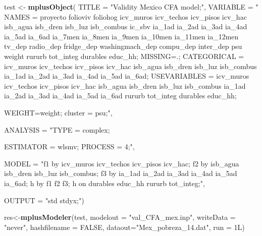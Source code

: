 \documentclass[]{book}
\newenvironment{Shaded}{\begin{snugshade}}{\end{snugshade}}
\newcommand{\DataTypeTok}[1]{\textcolor[rgb]{0.13,0.29,0.53}{#1}}
\newcommand{\KeywordTok}[1]{\textcolor[rgb]{0.13,0.29,0.53}{\textbf{#1}}}
\newcommand{\NormalTok}[1]{#1}
\newcommand{\OtherTok}[1]{\textcolor[rgb]{0.56,0.35,0.01}{#1}}
\newcommand{\StringTok}[1]{\textcolor[rgb]{0.31,0.60,0.02}{#1}}
\begin{document}
\begin{Shaded}
\begin{Highlighting}[]
\NormalTok{test <-}\StringTok{ }\KeywordTok{mplusObject}\NormalTok{(}
\DataTypeTok{TITLE =} \StringTok{"Validity Mexico CFA model;"}\NormalTok{,}
   \DataTypeTok{VARIABLE =} \StringTok{"}
\StringTok{     NAMES = proyecto folioviv foliohog icv_muros icv_techos}
\StringTok{             icv_pisos icv_hac isb_agua isb_dren isb_luz isb_combus}
\StringTok{             ic_sbv ia_1ad ia_2ad ia_3ad ia_4ad ia_5ad ia_6ad}
\StringTok{             ia_7men ia_8men ia_9men ia_10men ia_11men ia_12men}
\StringTok{             tv_dep radio_dep fridge_dep}
\StringTok{             washingmach_dep compu_dep inter_dep psu weight}
\StringTok{             rururb tot_integ durables educ_hh;}
\StringTok{MISSING=.;}
\StringTok{     CATEGORICAL = icv_muros icv_techos icv_pisos icv_hac isb_agua}
\StringTok{                   isb_dren isb_luz isb_combus  ia_1ad}
\StringTok{                   ia_2ad ia_3ad ia_4ad ia_5ad ia_6ad;}
\StringTok{     USEVARIABLES = icv_muros icv_techos icv_pisos icv_hac isb_agua}
\StringTok{                   isb_dren isb_luz isb_combus  ia_1ad}
\StringTok{                   ia_2ad ia_3ad ia_4ad ia_5ad ia_6ad}
\StringTok{                   rururb tot_integ durables educ_hh;}

\StringTok{WEIGHT=weight;}
\StringTok{cluster = psu;"}\NormalTok{,}

   \DataTypeTok{ANALYSIS =} \StringTok{"TYPE = complex;}

\StringTok{ESTIMATOR = wlsmv;}
\StringTok{PROCESS = 4;"}\NormalTok{,}

\DataTypeTok{MODEL =} \StringTok{"f1 by icv_muros icv_techos icv_pisos icv_hac;}
\StringTok{  f2 by isb_agua}
\StringTok{        isb_dren isb_luz isb_combus;}
\StringTok{  f3 by ia_1ad ia_2ad ia_3ad ia_4ad ia_5ad ia_6ad;}
\StringTok{  h  by f1 f2 f3;}
\StringTok{  h on durables educ_hh rururb tot_integ;"}\NormalTok{,}

\DataTypeTok{OUTPUT =} \StringTok{"std stdyx;"}\NormalTok{)}

\NormalTok{res<-}\KeywordTok{mplusModeler}\NormalTok{(test, }\DataTypeTok{modelout =} \StringTok{"val_CFA_mex.inp"}\NormalTok{,}
                    \DataTypeTok{writeData =} \StringTok{"never"}\NormalTok{, }\DataTypeTok{hashfilename =} \OtherTok{FALSE}\NormalTok{,}
                    \DataTypeTok{dataout=}\StringTok{"Mex_pobreza_14.dat"}\NormalTok{, }\DataTypeTok{run =}\NormalTok{ 1L)}
\end{Highlighting}
\end{Shaded}
\end{document}
